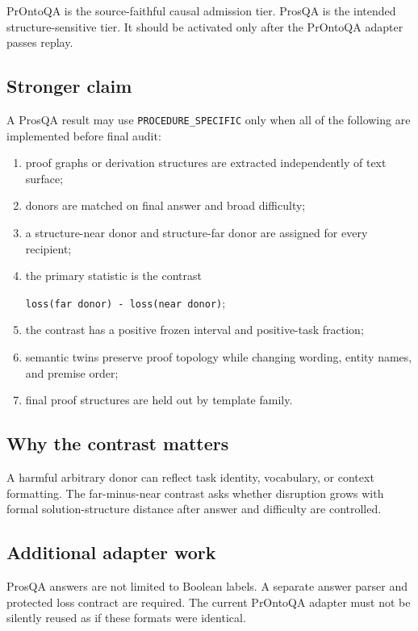 \documentclass[
  10pt,
]{article}
\begin{document}
PrOntoQA is the source-faithful causal admission tier. ProsQA is the
intended structure-sensitive tier. It should be activated only after the
PrOntoQA adapter passes replay.

\subsection{Stronger claim}\label{stronger-claim}

A ProsQA result may use \texttt{PROCEDURE\_SPECIFIC} only when all of
the following are implemented before final audit:

\begin{enumerate}
\def\labelenumi{\arabic{enumi}.}
\item
  proof graphs or derivation structures are extracted independently of
  text surface;
\item
  donors are matched on final answer and broad difficulty;
\item
  a structure-near donor and structure-far donor are assigned for every
  recipient;
\item
  the primary statistic is the contrast

  \texttt{loss(far\ donor)\ -\ loss(near\ donor)};
\item
  the contrast has a positive frozen interval and positive-task
  fraction;
\item
  semantic twins preserve proof topology while changing wording, entity
  names, and premise order;
\item
  final proof structures are held out by template family.
\end{enumerate}

\subsection{Why the contrast matters}\label{why-the-contrast-matters}

A harmful arbitrary donor can reflect task identity, vocabulary, or
context formatting. The far-minus-near contrast asks whether disruption
grows with formal solution-structure distance after answer and
difficulty are controlled.

\subsection{Additional adapter work}\label{additional-adapter-work}

ProsQA answers are not limited to Boolean labels. A separate answer
parser and protected loss contract are required. The current PrOntoQA
adapter must not be silently reused as if these formats were identical.
\end{document}

